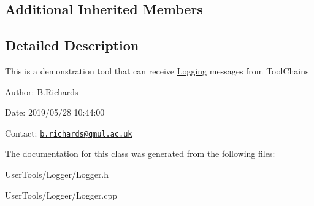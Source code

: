 \subsection*{Additional Inherited Members}


\subsection{Detailed Description}
This is a demonstration tool that can receive \hyperlink{classLogging}{Logging} messages from Tool\-Chains

\begin{DoxyParagraph}{Author\-:}
B.\-Richards 
\end{DoxyParagraph}
\begin{DoxyParagraph}{Date\-:}
2019/05/28 10\-:44\-:00 
\end{DoxyParagraph}
Contact\-: \href{mailto:b.richards@qmul.ac.uk}{\tt b.\-richards@qmul.\-ac.\-uk} 

The documentation for this class was generated from the following files\-:\begin{DoxyCompactItemize}
\item 
User\-Tools/\-Logger/Logger.\-h\item 
User\-Tools/\-Logger/Logger.\-cpp\end{DoxyCompactItemize}
